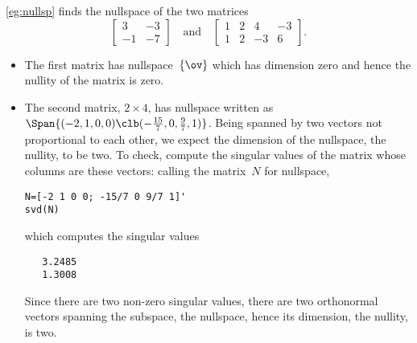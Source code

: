\begin{example} \label{eg:}
\autoref{eg:nullsp} finds the nullspace of the two matrices
\begin{equation*}
\begin{bmatrix} 3&-3\\-1&-7 \end{bmatrix}
\quad\text{and}\quad
\begin{bmatrix} 1&2&4&-3\\
1&2&-3&6 \end{bmatrix}.
\end{equation*}
\begin{itemize}
\item The first matrix has nullspace~\(\{\ov\}\) which has dimension zero and hence the nullity of the matrix is zero.
\item The second matrix, \(2\times4\), has nullspace written as \(\Span\{(-2,1,0,0)\clb(-\frac{15}7,0,\frac97,1)\}\).
Being spanned by two vectors not proportional to each other, we expect the dimension of the nullspace, the nullity, to be two.
To check, compute the singular values of the matrix whose columns are these vectors: calling the matrix~\(N\) for nullspace,
\begin{verbatim}
N=[-2 1 0 0; -15/7 0 9/7 1]'
svd(N)
\end{verbatim}
\setbox\ajrqrbox\hbox{}%
\marginpar{\usebox{\ajrqrbox}}%
which computes the singular values
\begin{verbatim}
   3.2485
   1.3008
\end{verbatim}
Since there are two non-zero singular values, there are two orthonormal vectors spanning the subspace, the nullspace, hence its dimension, the nullity, is two.
\end{itemize}
\end{example}



